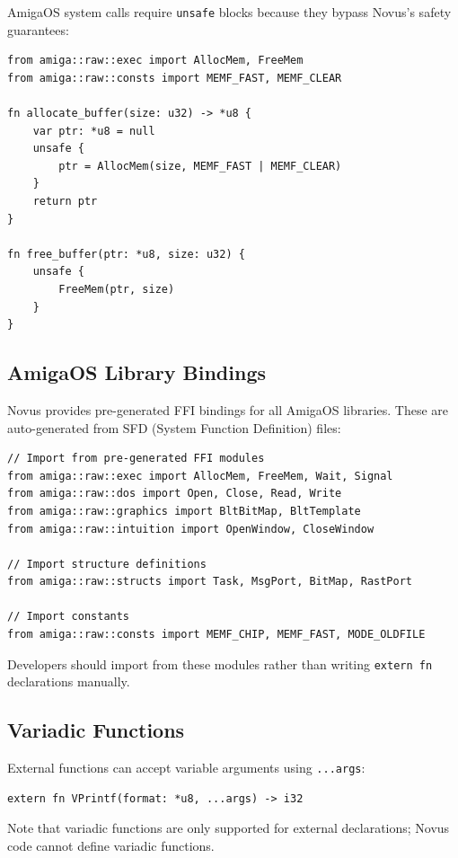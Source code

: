 AmigaOS system calls require \texttt{unsafe} blocks because they bypass Novus's safety guarantees:

\begin{lstlisting}
from amiga::raw::exec import AllocMem, FreeMem
from amiga::raw::consts import MEMF_FAST, MEMF_CLEAR

fn allocate_buffer(size: u32) -> *u8 {
    var ptr: *u8 = null
    unsafe {
        ptr = AllocMem(size, MEMF_FAST | MEMF_CLEAR)
    }
    return ptr
}

fn free_buffer(ptr: *u8, size: u32) {
    unsafe {
        FreeMem(ptr, size)
    }
}
\end{lstlisting}

\subsection{AmigaOS Library Bindings}
\label{subsec:ffi-bindings}

Novus provides pre-generated FFI bindings for all AmigaOS libraries. These are auto-generated from SFD (System Function Definition) files:

\begin{lstlisting}
// Import from pre-generated FFI modules
from amiga::raw::exec import AllocMem, FreeMem, Wait, Signal
from amiga::raw::dos import Open, Close, Read, Write
from amiga::raw::graphics import BltBitMap, BltTemplate
from amiga::raw::intuition import OpenWindow, CloseWindow

// Import structure definitions
from amiga::raw::structs import Task, MsgPort, BitMap, RastPort

// Import constants
from amiga::raw::consts import MEMF_CHIP, MEMF_FAST, MODE_OLDFILE
\end{lstlisting}

Developers should import from these modules rather than writing \texttt{extern fn} declarations manually.

\subsection{Variadic Functions}
\label{subsec:variadic}

External functions can accept variable arguments using \texttt{...args}:

\begin{lstlisting}
extern fn VPrintf(format: *u8, ...args) -> i32
\end{lstlisting}

Note that variadic functions are only supported for external declarations; Novus code cannot define variadic functions.

